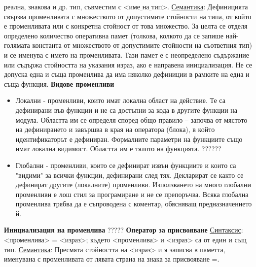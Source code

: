 \documentclass{article}
\begin{document}
реална, знакова и др. тип, съвместим с $\text{<име\_на\_тип>}$. \newline\newline
\underline{Семантика}:
Дефиницията свързва променливата с множеството от допустимите стойности на типа, от който е променливата или
с конкретна стойност от това множество. За целта се отделя определено количество оперативна памет
(толкова, колкото да се запише най-голямата константа от множеството от допустимите стойности на съответния
тип) и се именува с името на променливата. Тази памет е с неопределено съдържание или съдържа стойността на
указания израз, ако е направена инициализация. Не се допуска една и съща променлива да има няколко дефиниции
в рамките на една и съща функция. \newline\newline
\textbf{Видове променливи}
\begin{itemize}
    \item Локални - променливи, които имат локална област на действие. Те са дефинирани във функции и не са достъпни за кода в
    другите функции на модула. Областта им се определя според общо правило – започва от мястото на дефинирането и завършва в
    края на оператора (блока), в който идентификаторът е дефиниран. Формалните параметри на функциите също имат локална видимост.
    Областта им е тялото на функцията. ??????
    \item Глобални - променливи, които се дефинират извън функциите и които са "видими" за всички функции, дефинирани след тях.
    Декларират се както се дефинират другите (локалните) променливи. Използването на много глобални променливи е лош стил за
    програмиране и не се препоръчва. Всяка глобална променлива трябва да е съпроводена с коментар, обясняващ предназначението й.
\end{itemize}
\textbf{Инициализация на променлива}
????? \newline\newline
\textbf{Оператор за присвояване} \newline\newline
\underline{Синтаксис}:
<променлива> = <израз>; \newline
където <променлива> и <израз> са от един и същ тип. \newline\newline
\underline{Семантика}:
Пресмята стойността на <израз> и я записва в паметта, именувана с променливата от лявата страна на знака за присвояване =. \newline\newline
\end{document}
